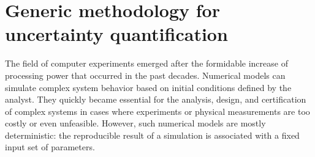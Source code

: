 \section*{Generic methodology for uncertainty quantification} 

The field of computer experiments emerged after the formidable increase of processing power that occurred in the past decades. 
Numerical models can simulate complex system behavior based on initial conditions defined by the analyst. 
They quickly became essential for the analysis, design, and certification of complex systems in cases where experiments or physical measurements are too costly or even unfeasible. 
However, such numerical models are mostly deterministic: the reproducible result of a simulation is associated with a fixed input set of parameters. 


